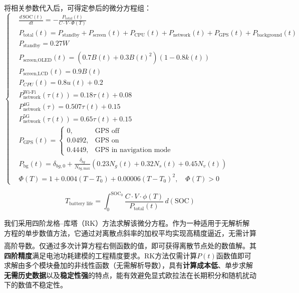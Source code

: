 \documentclass{mcmthesis}  %
\newcommand{\upcite}[1]{\textsuperscript{\textsuperscript{\cite{#1}}}}
\begin{document}
	将相关参数代入后，可得定参后的微分方程组：
	\begin{equation}
		\left\{
		\begin{aligned}
			&\frac{d\,\text{SOC}(t)}{dt} = -\frac{P_{\text{total}}(t)}{C \cdot V \cdot \Phi(T)} 
			\\
			&P_{\text{total}}(t) = P_{\text{standby}} + P_{\text{screen}}(t) + P_{\text{CPU}}(t) + P_{\text{network}}(t) + P_{\text{GPS}}(t) + P_{\text{background}}(t) 
			\\
			&P_{\text{standby}}= 0.27W\\
			&P_{\text{screen,OLED}}(t) =\left( 0.7B(t) + 0.3B(t)^2 \right) \left( 1 - 0.8k(t) \right) 
			\\
			&P_{\text{screen,LCD}}(t) = 0.9 B(t)
			\\
			&P_{CPU}(t)=0.8u(t)+0.2 
			\\
			&P_{\text{network}}^{\text{Wi-Fi}}(\tau(t)) = 0.18\tau(t) + 0.08
			\\
			&P_{\text{network}}^{4\text{G}}(\tau) = 0.507\tau(t) + 0.15  
			\\
			&P_{\text{network}}^{5\text{G}}(\tau(t)) = 0.65\tau(t) + 0.15
			\\
			&P_{\text{GPS}}(t) =
			\begin{cases}
				0, & \text{GPS off} \\
				0.0492, & \text{GPS on} \\
				0.4449, & \text{GPS in navigation mode}
			\end{cases}
			\\
			&P_{\text{bg}}(t) = \delta_{bg,0} + \frac{\delta_{bg}}{N_{bg,\text{max}}} \left( 0.23 N_g(t) + 0.32 N_s(t) + 0.45 N_v(t) \right)
			\\
			& \Phi(T) = 1 + 0.004(T - T_0) + 0.00006(T - T_0)^2,\quad \Phi(T) > 0
		\end{aligned}
		\right.
	\end{equation}
	
	\begin{equation}
		T_{\text{battery life}} = \int_{0}^{\text{SOC}_0} \frac{C \cdot V \cdot \phi(T)}{P_{\text{total}}(t)} \, d(\text{SOC})
	\end{equation}
	
	我们采用四阶龙格--库塔（RK）方法求解该微分方程。作为一种适用于无解析解方程的单步数值方法，它通过对离散点斜率的加权平均实现高精度逼近，无需计算高阶导数。仅通过多次计算方程右侧函数的值，即可获得离散节点处的数值解\upcite{8}。其\textbf{四阶精度}满足电池功耗建模的工程精度要求。RK方法仅需计算\( P(t) \)函数值即可求解由多个模块叠加的非线性函数（无需解析导数），具有\textbf{计算成本低}、单步求解\textbf{无需历史数据}以及\textbf{稳定性强}的特点，能有效避免显式欧拉法在长期积分和随机扰动下的数值不稳定性。
	
\end{document}
